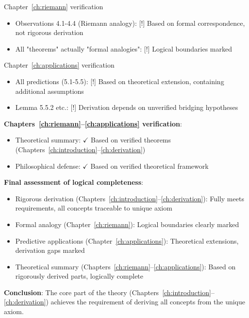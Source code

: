 Chapter~\ref{ch:riemann} verification
\begin{itemize}
\item Observations 4.1-4.4 (Riemann analogy): [!] Based on formal correspondence, not rigorous derivation
\item All "theorems" actually "formal analogies": [!] Logical boundaries marked
\end{itemize}

Chapter~\ref{ch:applications} verification
\begin{itemize}
\item All predictions (5.1-5.5): [!] Based on theoretical extension, containing additional assumptions
\item Lemma 5.5.2 etc.: [!] Derivation depends on unverified bridging hypotheses
\end{itemize}

\textbf{Chapters~\ref{ch:riemann}--\ref{ch:applications} verification}:
\begin{itemize}
\item Theoretical summary: $\checkmark$ Based on verified theorems (Chapters~\ref{ch:introduction}--\ref{ch:derivation})
\item Philosophical defense: $\checkmark$ Based on verified theoretical framework
\end{itemize}

\textbf{Final assessment of logical completeness}:
\begin{itemize}
\item Rigorous derivation (Chapters~\ref{ch:introduction}--\ref{ch:derivation}): Fully meets requirements, all concepts traceable to unique axiom
\item Formal analogy (Chapter~\ref{ch:riemann}): Logical boundaries clearly marked
\item Predictive applications (Chapter~\ref{ch:applications}): Theoretical extensions, derivation gaps marked
\item Theoretical summary (Chapters~\ref{ch:riemann}--\ref{ch:applications}): Based on rigorously derived parts, logically complete
\end{itemize}

\textbf{Conclusion}: The core part of the theory (Chapters~\ref{ch:introduction}--\ref{ch:derivation}) achieves the requirement of deriving all concepts from the unique axiom.


